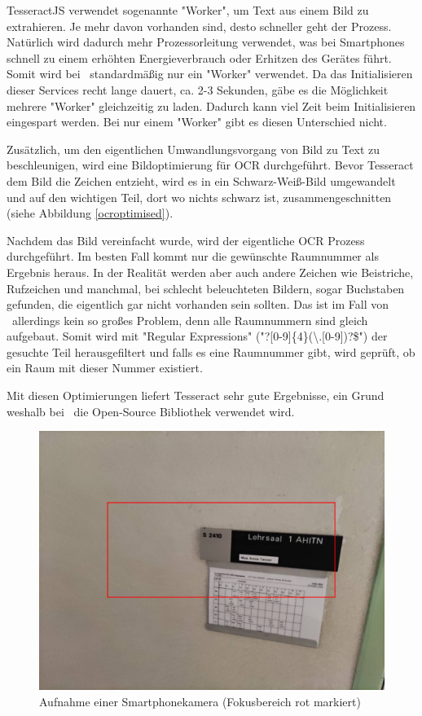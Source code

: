 
TesseractJS verwendet sogenannte "Worker", um Text aus einem Bild zu extrahieren. Je mehr davon vorhanden sind, desto schneller geht der Prozess. Natürlich wird dadurch mehr Prozessorleitung verwendet, was bei Smartphones schnell zu einem erhöhten Energieverbrauch oder Erhitzen des Gerätes führt. Somit wird bei \ZELIA\ standardmäßig nur ein "Worker" verwendet. Da das Initialisieren dieser Services recht lange dauert, ca. 2-3 Sekunden, gäbe es die Möglichkeit mehrere "Worker" gleichzeitig zu laden. Dadurch kann viel Zeit beim Initialisieren eingespart werden. Bei nur einem "Worker" gibt es diesen Unterschied nicht. 

Zusätzlich, um den eigentlichen Umwandlungsvorgang von Bild zu Text zu beschleunigen, wird eine Bildoptimierung für OCR durchgeführt. Bevor Tesseract dem Bild die Zeichen entzieht, wird es in ein Schwarz-Weiß-Bild umgewandelt und auf den wichtigen Teil, dort wo nichts schwarz ist, zusammengeschnitten (siehe Abbildung \ref{ocroptimised}).

Nachdem das Bild vereinfacht wurde, wird der eigentliche OCR Prozess durchgeführt. Im besten Fall kommt nur die gewünschte Raumnummer als Ergebnis heraus. In der Realität werden aber auch andere Zeichen wie Beistriche, Rufzeichen und manchmal, bei schlecht beleuchteten Bildern, sogar Buchstaben gefunden, die eigentlich gar nicht vorhanden sein sollten. Das ist im Fall von \ZELIA\ allerdings kein so großes Problem, denn alle Raumnummern sind gleich aufgebaut. Somit wird mit "Regular Expressions" ("{\ttfamily [A-Z]?[0-9]\{4\}(\textbackslash.[0-9])?\$}") der gesuchte Teil herausgefiltert und falls es eine Raumnummer gibt, wird geprüft, ob ein Raum mit dieser Nummer existiert.

Mit diesen Optimierungen liefert Tesseract sehr gute Ergebnisse, ein Grund weshalb bei \ZELIA\ die Open-Source Bibliothek verwendet wird.


\begin{figure}
    \centering
    \includegraphics[width=120mm]{media/OCR/original}
    \caption{Aufnahme einer Smartphonekamera (Fokusbereich rot markiert)}
    \label{fig:phonecam}
\end{figure}


